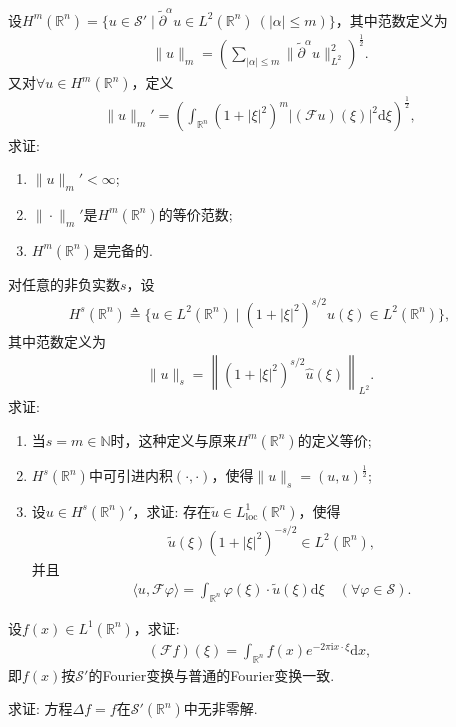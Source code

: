 \documentclass[../../main.tex]{subfiles}%
\begin{document}
\begin{example}
设$H^m(\mathbb{R}^n) = \{u \in \mathscr{S}' \mid \widetilde{\partial}^\alpha u \in L^2(\mathbb{R}^n)\ (|\alpha| \leqslant m)\}$，其中范数定义为
\begin{align*}
\|u\|_m = \left(\sum\limits_{|\alpha|\leqslant m}\|\widetilde{\partial}^\alpha u\|_{L^2}^2\right)^{\frac12}.
\end{align*}
又对$\forall u \in H^m(\mathbb{R}^n)$，定义
\begin{align*}
\|u\|_m' = \left(\int_{\mathbb{R}^n}(1+|\xi|^2)^m|(\mathscr{F}u)(\xi)|^2\mathrm{d}\xi\right)^{\frac12},
\end{align*}
求证:
\begin{enumerate}[(1)]
\item $\|u\|_m' < \infty$;
\item $\|\cdot\|_m'$是$H^m(\mathbb{R}^n)$的等价范数;
\item $H^m(\mathbb{R}^n)$是完备的.
\end{enumerate}
\end{example}

\begin{example}
对任意的非负实数$s$，设
\begin{align*}
H^s(\mathbb{R}^n) \triangleq \{u \in L^2(\mathbb{R}^n) \mid (1+|\xi|^2)^{s/2}\widehat{u}(\xi) \in L^2(\mathbb{R}^n)\},
\end{align*}
其中范数定义为
\begin{align*}
\|u\|_s = \left\|(1+|\xi|^2)^{s/2}\widehat{u}(\xi)\right\|_{L^2}.
\end{align*}
求证:
\begin{enumerate}[(1)]
\item 当$s = m \in \mathbb{N}$时，这种定义与原来$H^m(\mathbb{R}^n)$的定义等价;
\item $H^s(\mathbb{R}^n)$中可引进内积$(\cdot,\cdot)$，使得$\|u\|_s = (u,u)^{\frac12}$;
\item 设$u \in H^s(\mathbb{R}^n)'$，求证: 存在$\widetilde{u} \in L^1_{\mathrm{loc}}(\mathbb{R}^n)$，使得
\begin{align*}
\widetilde{u}(\xi)(1+|\xi|^2)^{-s/2} \in L^2(\mathbb{R}^n),
\end{align*}
并且
\begin{align*}
\langle u,\mathscr{F}\varphi\rangle = \int_{\mathbb{R}^n}\varphi(\xi)\cdot\widetilde{u}(\xi)\mathrm{d}\xi \quad (\forall \varphi \in \mathscr{S}).
\end{align*}
\end{enumerate}
\end{example}

\begin{example}
设$f(x) \in L^1(\mathbb{R}^n)$，求证:
\begin{align*}
(\mathscr{F}f)(\xi) = \int_{\mathbb{R}^n}f(x)e^{-2\pi \mathrm{i} x\cdot\xi}\mathrm{d}x,
\end{align*}
即$f(x)$按$\mathscr{S}'$的Fourier变换与普通的Fourier变换一致.
\end{example}

\begin{example}
求证: 方程$\Delta f = f$在$\mathscr{S}'(\mathbb{R}^n)$中无非零解.
\end{example}
\end{document}
